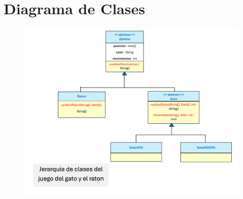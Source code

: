 \documentclass[12pt, Tahoma]{article}
\begin{document}
	\section*{Diagrama de Clases}
	\begin{figure}[H]
		\centering
		\includegraphics[scale=0.6]{gatoRaton.png}
	\end{figure}
\end{document}
